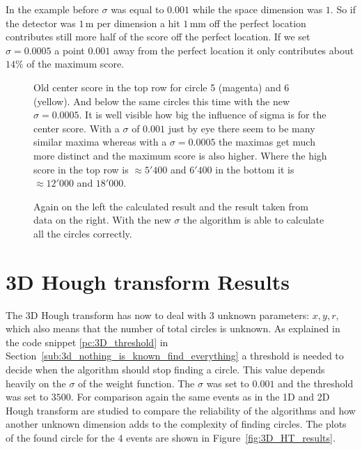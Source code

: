 \documentclass[11pt,twoside]{scrreprt}
\begin{document}
In the example before $\sigma$ was equal to $0.001$ while the space dimension was $1$. So if the detector was $1$\,m per dimension a hit $1$\,mm off the perfect location contributes still more half of the score off the perfect location. If we set $\sigma=0.0005$ a point $0.001$ away from the perfect location it only contributes about $14\%$ of the maximum score.

\begin{figure}
\centering
 
  \caption[2D HT: Comparison center scores 6 circles, 200 background hits]{Old center score in the top row for circle 5 (magenta) and 6 (yellow). And below the same circles this time with the new $\sigma=0.0005$. It is well visible how big the influence of sigma is for the center score. With a $\sigma$ of $0.001$ just by eye there seem to be many similar maxima whereas with a $\sigma=0.0005$ the maximas get much more distinct and the maximum score is also higher. Where the high score in the top row is $\approx 5'400$ and $6'400$ in the bottom it is $\approx 12'000$ and $18'000$.}
\end{figure}


\begin{figure}
\centering
\caption[2D HT: Comparison result, 6 circles, 200 background hits]{Again on the left the calculated result and the result taken from data on the right. With the new $\sigma$ the algorithm is able to calculate all the circles correctly.}\label{2d_result_6c_200bg_corr}
\end{figure}

\clearpage
\section{3D Hough transform Results} %
\label{sec:3d_hough_transform_results}
The 3D Hough transform has now to deal with 3 unknown parameters: $x,y,r$, which also means that the number of total circles is
unknown. As explained in the code snippet \ref{pc:3D_threshold} in Section~\ref{sub:3d_nothing_is_known_find_everything} a threshold is needed to decide when the algorithm
should stop finding a circle. This value depends heavily on the $\sigma$ of the weight function. The $\sigma$ was set to $0.001$ and the threshold
was set to $3500$.
For comparison again the same events as in the 1D and 2D Hough transform are studied to compare the reliability of the algorithms and how another
unknown dimension adds to the complexity of finding circles. The plots of the found circle for the 4 events are shown in 
Figure~\ref{fig:3D_HT_results}.
\end{document}
